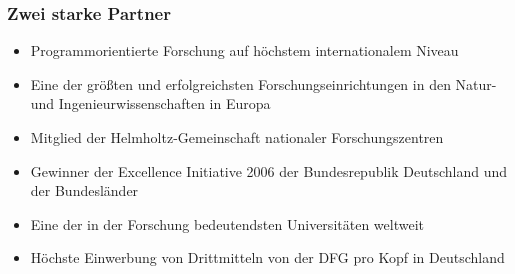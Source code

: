 \documentclass[t]{beamer}
\begin{document}
\begin{frame}
  \frametitle{Zwei starke Partner}

  \small
  \renewcommand{\baselinestretch}{.95}\selectfont
  \begin{minipage}{.625\linewidth}
    \begin{itemize}
    \item Programmorientierte Forschung auf höchstem internationalem Niveau
    \item Eine der größten und erfolgreichsten Forschungseinrichtungen  
          in den Natur- und Ingenieurwissenschaften in Europa
    \item Mitglied der Helmholtz-Gemeinschaft nationaler Forschungszentren
    \end{itemize}

    \begin{itemize}
    \item Gewinner der Excellence Initiative 2006 der Bundesrepublik
          Deutschland und der Bundesländer
    \item Eine der in der Forschung bedeutendsten Universitäten weltweit
    \item Höchste Einwerbung von Drittmitteln von der DFG pro Kopf in
          Deutschland
    \end{itemize}
  \end{minipage}
  \hfill
  \parbox{.325\linewidth}{}
\end{frame}
\end{document}
